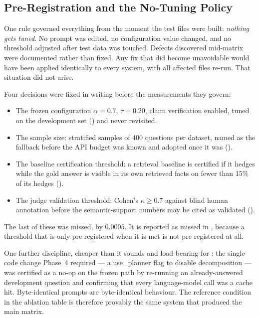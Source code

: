 \subsection{Pre-Registration and the No-Tuning
Policy}\label{sec:pre-registration}

One rule governed everything from the moment the test files were built:
\emph{nothing gets tuned}. No prompt was edited, no configuration value changed,
and no threshold adjusted after test data was touched. Defects discovered
mid-matrix were documented rather than fixed. Any fix that did become
unavoidable would have been applied identically to every system, with all
affected files re-run. That situation did not arise.

Four decisions were fixed in writing before the measurements they govern:

\begin{itemize}
  \item The frozen configuration $\alpha = 0.7$, $\tau = 0.20$, claim
  verification enabled, tuned on the development set ()
  and never revisited.
  \item The sample size: stratified samples of 400 questions per dataset, named
  as the fallback before the API budget was known and adopted once it was
  ().
  \item The baseline certification threshold: a retrieval baseline is certified
  if it hedges while the gold answer is visible in its own retrieved facts on
  fewer than 15\% of its hedges ().
  \item The judge validation threshold: Cohen's $\kappa \geq 0.7$ against blind
  human annotation before the semantic-support numbers may be cited as validated
  ().
\end{itemize}

The last of these was missed, by $0.0005$. It is reported as missed in
, because a threshold that is only pre-registered when it is met
is not pre-registered at all.

One further discipline, cheaper than it sounds and load-bearing for
: the single code change Phase~4 required --- a
\textsf{use\_planner} flag to disable decomposition --- was certified as a no-op
on the frozen path by re-running an already-answered development question and
confirming that every language-model call was a cache hit. Byte-identical
prompts are byte-identical behaviour. The reference condition in the ablation
table is therefore provably the same system that produced the main matrix.


